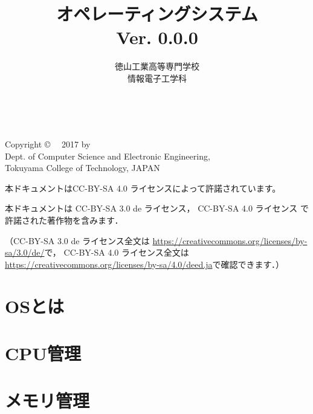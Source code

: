 \documentclass[a4paper,11pt,twocolumn]{ltjsbook}     %
\begin{document}
\frontmatter
\title{オペレーティングシステム\\Ver. 0.0.0}
\author{徳山工業高等専門学校\\情報電子工学科}
\date{}
\maketitle

\thispagestyle{empty}
\onecolumn
~
\vfill
\begin{flushleft}
Copyright \copyright ~~ 2017 by \\
Dept. of Computer Science and Electronic Engineering, \\
Tokuyama College of Technology, JAPAN
\end{flushleft}

\vspace{0.8cm}
本ドキュメントはCC-BY-SA 4.0 ライセンスによって許諾されています。

本ドキュメントは
CC-BY-SA 3.0 de ライセンス，
CC-BY-SA 4.0 ライセンス
で許諾された著作物を含みます．

（CC-BY-SA 3.0 de ライセンス全文は
\url{https://creativecommons.org/licenses/by-sa/3.0/de/}で，
CC-BY-SA 4.0 ライセンス全文は
\url{https://creativecommons.org/licenses/by-sa/4.0/deed.ja}で確認できます．）

\setcounter{tocdepth}{2}
\tableofcontents

\mainmatter

\part{OSとは}

\part{CPU管理}

\part{メモリ管理}
\end{document}
